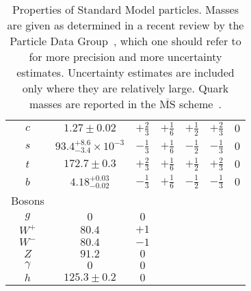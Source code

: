 \begin{table}[tp]
\begin{tabular}{ccccccc}
$c$                         & $1.27 \pm 0.02$                     & $+\frac{2}{3}$       & $+\frac{1}{6}$       & $+\frac{1}{2}$       & $+\frac{2}{3}$       & $0$                  \\
$s$                         & $93.4^{+8.6}_{-3.4}\times10^{-3}$   & $-\frac{1}{3}$       & $+\frac{1}{6}$       & $-\frac{1}{2}$       & $-\frac{1}{3}$       & $0$                  \\
$t$                         & $172.7\pm0.3$                       & $+\frac{2}{3}$       & $+\frac{1}{6}$       & $+\frac{1}{2}$       & $+\frac{2}{3}$       & $0$                  \\
$b$                         & $4.18^{+0.03}_{-0.02}$              & $-\frac{1}{3}$       & $+\frac{1}{6}$       & $-\frac{1}{2}$       & $-\frac{1}{3}$       & $0$                  \\
\multicolumn{1}{l}{Bosons}  & \multicolumn{1}{l}{}                & \multicolumn{1}{l}{} & \multicolumn{1}{l}{} & \multicolumn{1}{l}{} & \multicolumn{1}{l}{} & \multicolumn{1}{l}{} \\
$g$                         & $0$                                 & $0$                  &                      &                      &                      &                      \\
$W^+$                       & $80.4$                              & $+1$                 &                      &                      &                      &                      \\
$W^-$                       & $80.4$                              & $-1$                 &                      &                      &                      &                      \\
$Z$                         & $91.2$                              & $0$                  &                      &                      &                      &                      \\
$\gamma$                    & $0$                                 & $0$                  &                      &                      &                      &                      \\
$h$                         & $125.3 \pm 0.2$                     & $0$                  &                      &                      &                      &
\end{tabular}
\caption[Properties of Standard Model particles]{%
Properties of Standard Model particles.
Masses are given as determined in a recent review by the
Particle Data Group~\cite{pdg2022ynf}, which one should refer to for more
precision and more uncertainty estimates.
Uncertainty estimates are included only where they are relatively large.
Quark masses are reported in the $\overline{\mathrm{MS}}$ scheme~\cite{
pdg2022ynf,
PhysRevD.18.3998
}.
}
\label{tab:theory_particles_sm_properties}
\end{table}


